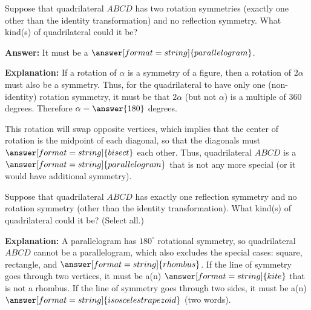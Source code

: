 \documentclass[nooutcomes]{ximera}
\begin{document}
\begin{question}
Suppose that quadrilateral $ABCD$ has two rotation symmetries (exactly one other than the identity transformation) and no reflection symmetry.  What kind(s) of quadrilateral could it be?  

\textbf{Answer:}  It must be a $\answer[format=string]{parallelogram}$.
\begin{question}
\textbf{Explanation:} If a rotation of $\alpha$ is a symmetry of a figure, then a rotation of $2\alpha$ must also be a symmetry.  Thus, for the quadrilateral to have only one (non-identity) rotation symmetry, it must be that $2\alpha$ (but not $\alpha$) is a multiple of 360 degrees.  Therefore $\alpha = \answer{180}$ degrees.  

This rotation will swap opposite vertices, which implies that the center of rotation is the midpoint of each diagonal, so that the diagonals must $\answer[format=string]{bisect}$ each other.  Thus, quadrilateral $ABCD$ is a $\answer[format=string]{parallelogram}$ that is not any more special (or it would have additional symmetry).  
\end{question}
\end{question}

\begin{question}
Suppose that quadrilateral $ABCD$ has exactly one reflection symmetry and no rotation symmetry (other than the identity transformation).  What kind(s) of quadrilateral could it be? (Select all.)
\begin{selectAll} 
\end{selectAll}
\begin{question}
\textbf{Explanation:}  A parallelogram has $180^\circ$ rotational symmetry, so quadrilateral $ABCD$ cannot be a parallelogram, which also excludes the special cases: square, rectangle, 
and $\answer[format=string]{rhombus}$.  If the line of symmetry goes through two vertices, it must be a(n) $\answer[format=string]{kite}$ that is not a rhombus.  If the line of symmetry goes through two sides, it must be a(n) $\answer[format=string]{isosceles trapezoid}$ (two words).  
\end{question}
\end{question}
\end{document}
